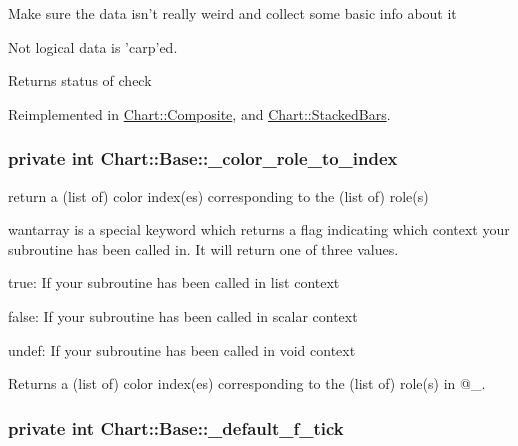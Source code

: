 Make sure the data isn't really weird and collect some basic info about it\par
 Not logical data is 'carp'ed.\par
 \begin{DoxyReturn}{Returns}
status of check 
\end{DoxyReturn}


Reimplemented in \hyperlink{classChart_1_1Composite_a67af0ad77d0c1f4f74da434ceb9cf53c}{Chart::Composite}, and \hyperlink{classChart_1_1StackedBars_a8d772463780f75cc985ae890ad8a94d1}{Chart::StackedBars}.

\hypertarget{classChart_1_1Base_a14098e898b9f9b5dca8d7a39ab9d4d57}{
\subsubsection[{\_\-color\_\-role\_\-to\_\-index}]{\setlength{\rightskip}{0pt plus 5cm}private int {\bf Chart::Base::\_\-color\_\-role\_\-to\_\-index}}}
\label{classChart_1_1Base_a14098e898b9f9b5dca8d7a39ab9d4d57}


return a (list of) color index(es) corresponding to the (list of) role(s) 

wantarray is a special keyword which returns a flag indicating which context your subroutine has been called in. It will return one of three values.

\begin{DoxyItemize}
\item true: If your subroutine has been called in list context \item false: If your subroutine has been called in scalar context \item undef: If your subroutine has been called in void context\end{DoxyItemize}
\begin{DoxyReturn}{Returns}
a (list of) color index(es) corresponding to the (list of) role(s) in @\_\-. 
\end{DoxyReturn}
\hypertarget{classChart_1_1Base_a060d522a2f0240cad4c746891d488f80}{
\subsubsection[{\_\-default\_\-f\_\-tick}]{\setlength{\rightskip}{0pt plus 5cm}private int {\bf Chart::Base::\_\-default\_\-f\_\-tick}}}
\label{classChart_1_1Base_a060d522a2f0240cad4c746891d488f80}


